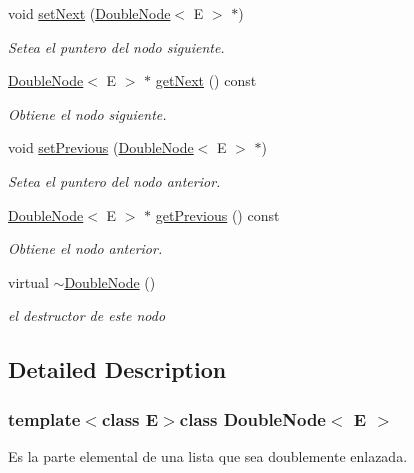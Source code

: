 \begin{DoxyCompactItemize}
void \hyperlink{class_double_node_aba52422e27040e524ba629445e9d8b93}{set\-Next} (\hyperlink{class_double_node}{Double\-Node}$<$ E $>$ $\ast$)
\begin{DoxyCompactList}\small\item\em Setea el puntero del nodo siguiente. \end{DoxyCompactList}\item 
\hyperlink{class_double_node}{Double\-Node}$<$ E $>$ $\ast$ \hyperlink{class_double_node_af5af4a30419b7a7c746361c1476e119f}{get\-Next} () const 
\begin{DoxyCompactList}\small\item\em Obtiene el nodo siguiente. \end{DoxyCompactList}\item 
void \hyperlink{class_double_node_aa76c202fdfd533984d9e9ae1892d194d}{set\-Previous} (\hyperlink{class_double_node}{Double\-Node}$<$ E $>$ $\ast$)
\begin{DoxyCompactList}\small\item\em Setea el puntero del nodo anterior. \end{DoxyCompactList}\item 
\hyperlink{class_double_node}{Double\-Node}$<$ E $>$ $\ast$ \hyperlink{class_double_node_a86c75b7ed7e944f9748363fe23b2518e}{get\-Previous} () const 
\begin{DoxyCompactList}\small\item\em Obtiene el nodo anterior. \end{DoxyCompactList}\item 
virtual \hyperlink{class_double_node_abd78f421a570cd0fb0cecfedb979d799}{$\sim$\-Double\-Node} ()
\begin{DoxyCompactList}\small\item\em el destructor de este nodo \end{DoxyCompactList}\end{DoxyCompactItemize}


\subsection{Detailed Description}
\subsubsection*{template$<$class E$>$class Double\-Node$<$ E $>$}

Es la parte elemental de una lista que sea doublemente enlazada. 

